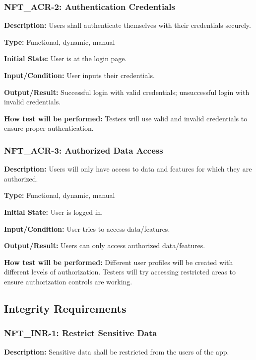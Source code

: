 \documentclass[12pt, titlepage]{article}
\begin{document}
\subsubsection*{\textbf{NFT\_ACR-2: Authentication Credentials}
}

\textbf{Description: }Users shall authenticate themselves with their credentials securely.

\textbf{Type: }Functional, dynamic, manual

\textbf{Initial State:} User is at the login page.

\textbf{Input/Condition: }User inputs their credentials.

\textbf{Output/Result: }Successful login with valid credentials; unsuccessful login with invalid credentials.

\textbf{How test will be performed:} Testers will use valid and invalid credentials to ensure proper authentication.


\subsubsection*{\textbf{NFT\_ACR-3: Authorized Data Access}
}

\textbf{Description: }Users will only have access to data and features for which they are authorized.

\textbf{Type: }Functional, dynamic, manual

\textbf{Initial State:} User is logged in.

\textbf{Input/Condition: }User tries to access data/features.

\textbf{Output/Result:} Users can only access authorized data/features.

\textbf{How test will be performed: }Different user profiles will be created with different levels of authorization. Testers will try accessing restricted areas to ensure authorization controls are working.
\newline
\subsection{Integrity Requirements}


\subsubsection*{\textbf{NFT\_INR-1: Restrict Sensitive Data}
}

\textbf{Description: }Sensitive data shall be restricted from the users of the app. 
\end{document}
